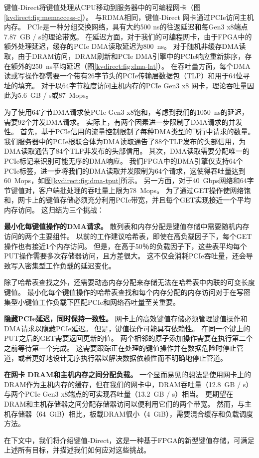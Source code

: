 键值-Direct将键值处理从CPU移动到服务器中的可编程网卡（图\ref {kvdirect:fig:memaccess-c}）。
与RDMA相同，键值-Direct 网卡通过PCIe访问主机内存。 PCIe是一种分组交换网络，具有大约500 ns的往返延迟和每Gen3 x8端点7.87~GB / s的理论带宽。
在延迟方面，对于我们的可编程网卡，由于FPGA中的额外处理延迟，缓存的PCIe DMA读取延迟为800~ns。
对于随机非缓存DMA读取，由于DRAM访问，DRAM刷新和PCIe DMA引擎中的PCIe响应重新排序，存在额外的250~ns平均延迟（图\ref {kvdirect:fig:dma-lat}）。
在吞吐量方面，每个DMA读或写操作都需要一个带有26字节头的PCIe传输层数据包（TLP）和用于64位寻址的填充。
对于以64字节粒度访问主机内存的PCIe Gen3 x8 网卡，理论吞吐量因此为5.6~GB / s或87~Mops。

为了使用64字节DMA请求使PCIe Gen3 x8饱和，考虑到我们的1050~ns的延迟，需要92个并发DMA请求。
实际上，有两个因素进一步限制了DMA请求的并发性。
首先，基于PCIe信用的流量控制限制了每种DMA类型的飞行中请求的数量。我们服务器中的PCIe根联合体为DMA读取通告了88个TLP发布的头部信用，为DMA读取通告了84个TLP非发布的头部信用。
其次，DMA读取需要分配唯一的PCIe标记来识别可能无序的DMA响应。
我们FPGA中的DMA引擎仅支持64个PCIe标签，进一步将我们的DMA读取并发限制为64个请求，这使得吞吐量达到60~Mops，如图\ref {kvdirect:fig:dma-tput}所示。
另一方面，对于40~Gbps网络和64字节键值对，客户端批处理的吞吐量上限为78~Mops。
为了通过GET操作使网络饱和，网卡上的键值存储必须充分利用PCIe带宽，并且每个GET实现接近一个平均内存访问。
这归结为三个挑战：

\textbf {最小化每键值操作的DMA请求。}
散列表和内存分配是键值存储中需要随机内存访问的两个主要组件。
以前的工作建议哈希表\cite {dragojevic2014farm,breslow2016horton}，即使在高负载因子下，每个GET操作也有接近1个内存访问。
但是，在高于50％的负载因子下，这些表平均每个PUT操作需要多次存储器访问，且方差很大。
这不仅会消耗PCIe吞吐量，还会导致写入密集型工作负载的延迟变化。

除了哈希表查找之外，还需要动态内存分配来存储无法在哈希表中内联的可变长度键值。
最小化每个键值操作的哈希表查找和每个内存分配的内存访问对于在写密集型小键值工作负载下匹配PCIe和网络吞吐量至关重要。

\textbf {隐藏PCIe延迟，同时保持一致性。}
网卡上的高效键值存储必须管理键值操作和DMA请求以隐藏PCIe延迟。
但是，键值操作可能具有依赖性。
在同一个键上的PUT之后的GET需要返回更新的值。
两个相邻的原子添加操作需要在执行第二个之前等待第一个完成。
这需要跟踪正在处理的键值操作并在数据危险时停止管道，或者更好地设计无序执行器以解决数据依赖性而不明确地停止管道。


\textbf {在网卡 DRAM和主机内存之间分配负载。}
一个显而易见的想法是使用网卡上的DRAM作为主机内存的缓存，但在我们的网卡中，DRAM吞吐量（12.8~GB / s）与两个PCIe Gen3 x8端点的可实现吞吐量（13.2~GB / s）相当。 
更期望在DRAM和主机存储器之间分配存储器访问以便利用它们的两个带宽。
然而，与主机存储器（64~GiB）相比，板载DRAM很小（4~GiB），需要混合缓存和负载调度方法。

在下文中，我们将介绍键值-Direct，这是一种基于FPGA的新型键值存储，可满足上述所有目标，并描述我们如何应对这些挑战。
